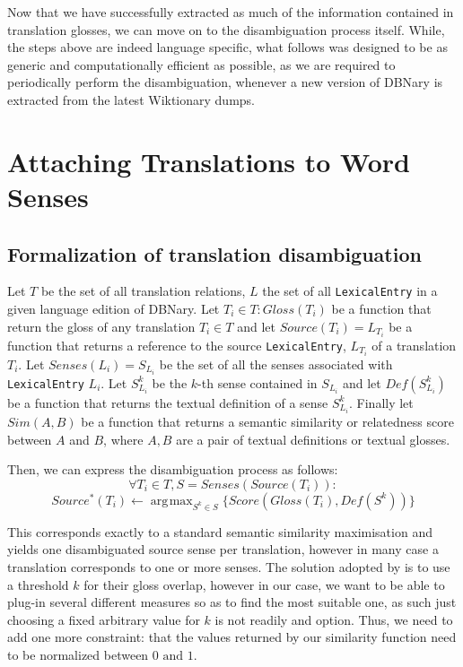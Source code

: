 \documentclass[10pt, a4paper]{article}
\DeclareMathOperator*{\argmax}{arg\!\max}
\begin{document}
Now that we have successfully extracted as much of the information contained in translation glosses, we can move on to the disambiguation process itself. While, the steps above are indeed language specific, what follows was designed to be as generic and computationally efficient as possible, as we are required to periodically perform the disambiguation, whenever a new version of DBNary is extracted from the latest Wiktionary dumps.



\section{Attaching Translations to Word Senses}
\subsection{Formalization of translation disambiguation}
Let \(T\) be the set of all translation relations, \(L\) the set of all \verb|LexicalEntry| in a given language edition of DBNary. Let \(T_i\in T: Gloss(T_i)\) be a function that return the gloss of any translation \(T_i\in T\) and let \(Source(T_i)=L_{T_i}\) be a function that returns a reference to the source \verb|LexicalEntry|, \(L_{T_i}\) of a translation \(T_i\). Let \(Senses(L_i)=S_{L_i}\) be the set of all the senses associated with \verb|LexicalEntry| \(L_i\). Let \(S_{L_i}^k\) be the \(k\)-th sense contained in \(S_{L_i}\) and let \(Def(S_{L_i}^k)\) be a function that returns the textual definition of a sense \(S_{L_i}^k\). Finally let \(Sim(A,B)\) be a function that returns a semantic similarity or relatedness score between \(A\) and \(B\), where \(A,B\) are a pair of textual definitions or textual glosses. 

Then, we can express the disambiguation process as follows:
\[
\forall T_i \in T, S=Senses(Source(T_i)): 
\]
\[
Source^*(T_i) \leftarrow  \argmax_{S^k\in S} \{Score(Gloss(T_i),Def(S^k))\}
\]

This corresponds exactly to a standard semantic similarity maximisation and yields one disambiguated source sense per translation, however in many case a translation corresponds to one or more senses. The solution adopted by \cite{MeyerGurevych:oup2012} is to use a threshold \(k\) for their gloss overlap, however in our case, we want to be able to plug-in several different measures so as to find the most suitable one, as such just choosing a fixed arbitrary value for \(k\) is not readily and option. Thus, we need to add one more constraint: that the values returned by our similarity function need to be normalized between \(0 \mbox{ and  } 1\).
\end{document}
